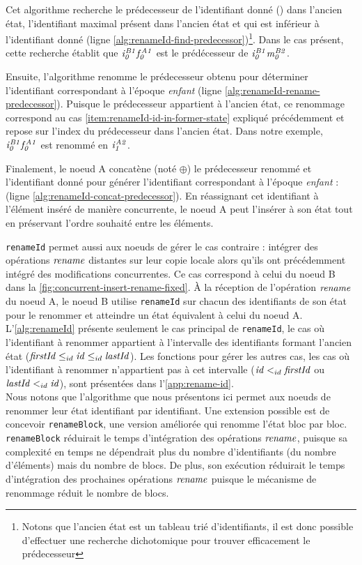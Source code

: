 Cet algorithme recherche le prédecesseur de l'identifiant donné () dans l'ancien état, \ie l'identifiant maximal présent dans l'ancien état et qui est inférieur à l'identifiant donné (ligne \ref{alg:renameId-find-predecessor})\footnote{Notons que l'ancien état est un tableau trié d'identifiants, il est donc possible d'effectuer une recherche dichotomique pour trouver efficacement le prédecesseur}.
Dans le cas présent, cette recherche établit que $\mathit{i}^{\mathit{B1}}_{\mathit{0}}\mathit{f}^{\mathit{A1}}_{\mathit{0}}$ est le prédécesseur de $\mathit{i}^{\mathit{B1}}_{\mathit{0}}\mathit{m}^{\mathit{B2}}_{\mathit{0}}$.

Ensuite, l'algorithme renomme le prédecesseur obtenu pour déterminer l'identifiant correspondant à l'époque \emph{enfant} (ligne \ref{alg:renameId-rename-predecessor}).
Puisque le prédecesseur appartient à l'ancien état, ce renommage correspond au cas \ref{item:renameId-id-in-former-state} expliqué précédemment et repose sur l'index du prédecesseur dans l'ancien état.
Dans notre exemple, $\mathit{i}^{\mathit{B1}}_{\mathit{0}}\mathit{f}^{\mathit{A1}}_{\mathit{0}}$ est renommé en $\mathit{i}^{\mathit{A2}}_{\mathit{1}}$.

Finalement, le noeud A concatène (noté $\oplus$) le prédecesseur renommé et l'identifiant donné pour générer l'identifiant correspondant à l'époque \emph{enfant} :  (ligne \ref{alg:renameId-concat-predecessor}).
En réassignant cet identifiant à l'élément inséré de manière concurrente, le noeud A peut l'insérer à son état tout en préservant l'ordre souhaité entre les éléments.

\texttt{renameId} permet aussi aux noeuds de gérer le cas contraire : intégrer des opérations $\mathit{rename}$ distantes sur leur copie locale alors qu'ils ont précédemment intégré des modifications concurrentes.
Ce cas correspond à celui du noeud B dans la \autoref{fig:concurrent-insert-rename-fixed}.
À la réception de l'opération $\mathit{rename}$ du noeud A, le noeud B utilise \texttt{renameId} sur chacun des identifiants de son état pour le renommer et atteindre un état équivalent à celui du noeud A.\\

L'\autoref{alg:renameId} présente seulement le cas principal de \texttt{renameId}, \ie le cas où l'identifiant à renommer appartient à l'intervalle des identifiants formant l'ancien état ($\mathit{firstId} \leq_{id} \mathit{id} \leq_{id} \mathit{lastId}$).
Les fonctions pour gérer les autres cas, \ie les cas où l'identifiant à renommer n'appartient pas à cet intervalle ($\mathit{id} <_{id} \mathit{firstId}$ ou $\mathit{lastId} <_{id} \mathit{id}$), sont présentées dans l'\autoref{app:rename-id}.\\

Nous notons que l'algorithme que nous présentons ici permet aux noeuds de renommer leur état identifiant par identifiant.
Une extension possible est de concevoir \texttt{renameBlock}, une version améliorée qui renomme l'état bloc par bloc.
\texttt{renameBlock} réduirait le temps d'intégration des opérations $\mathit{rename}$, puisque sa complexité en temps ne dépendrait plus du nombre d'identifiants (\ie du nombre d'éléments) mais du nombre de blocs.
De plus, son exécution réduirait le temps d'intégration des prochaines opérations $\mathit{rename}$ puisque le mécanisme de renommage réduit le nombre de blocs.
